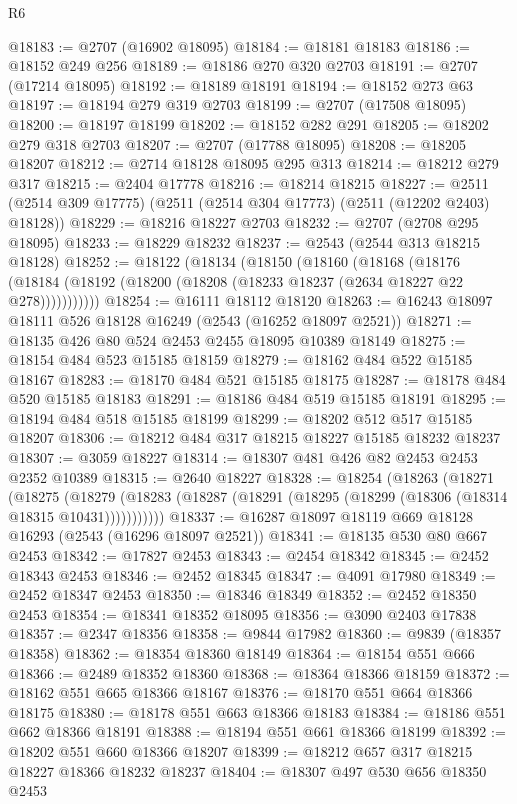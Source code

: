 \begin{lexlean}{R6}
\begin{coremodule}
@18183 := @2707 (@16902 @18095)
@18184 := @18181 @18183
@18186 := @18152 @249 @256
@18189 := @18186 @270 @320 @2703
@18191 := @2707 (@17214 @18095)
@18192 := @18189 @18191
@18194 := @18152 @273 @63
@18197 := @18194 @279 @319 @2703
@18199 := @2707 (@17508 @18095)
@18200 := @18197 @18199
@18202 := @18152 @282 @291
@18205 := @18202 @279 @318 @2703
@18207 := @2707 (@17788 @18095)
@18208 := @18205 @18207
@18212 := @2714 @18128 @18095 @295 @313
@18214 := @18212 @279 @317
@18215 := @2404 @17778
@18216 := @18214 @18215
@18227 := @2511 (@2514 @309 @17775) (@2511 (@2514 @304 @17773) (@2511 (@12202 @2403) @18128))
@18229 := @18216 @18227 @2703
@18232 := @2707 (@2708 @295 @18095)
@18233 := @18229 @18232
@18237 := @2543 (@2544 @313 @18215 @18128)
@18252 := @18122
    (@18134
      (@18150
        (@18160
          (@18168
            (@18176 (@18184 (@18192 (@18200 (@18208 (@18233 @18237 (@2634 @18227 @22 @278)))))))))))
@18254 := @16111 @18112 @18120
@18263 := @16243 @18097 @18111 @526 @18128 @16249 (@2543 (@16252 @18097 @2521))
@18271 := @18135 @426 @80 @524 @2453 @2455 @18095 @10389 @18149
@18275 := @18154 @484 @523 @15185 @18159
@18279 := @18162 @484 @522 @15185 @18167
@18283 := @18170 @484 @521 @15185 @18175
@18287 := @18178 @484 @520 @15185 @18183
@18291 := @18186 @484 @519 @15185 @18191
@18295 := @18194 @484 @518 @15185 @18199
@18299 := @18202 @512 @517 @15185 @18207
@18306 := @18212 @484 @317 @18215 @18227 @15185 @18232 @18237
@18307 := @3059 @18227
@18314 := @18307 @481 @426 @82 @2453 @2453 @2352 @10389
@18315 := @2640 @18227
@18328 := @18254
    (@18263
      (@18271
        (@18275
          (@18279 (@18283 (@18287 (@18291 (@18295 (@18299 (@18306 (@18314 @18315 @10431)))))))))))
@18337 := @16287 @18097 @18119 @669 @18128 @16293 (@2543 (@16296 @18097 @2521))
@18341 := @18135 @530 @80 @667 @2453
@18342 := @17827 @2453
@18343 := @2454 @18342
@18345 := @2452 @18343 @2453
@18346 := @2452 @18345
@18347 := @4091 @17980
@18349 := @2452 @18347 @2453
@18350 := @18346 @18349
@18352 := @2452 @18350 @2453
@18354 := @18341 @18352 @18095
@18356 := @3090 @2403 @17838
@18357 := @2347 @18356
@18358 := @9844 @17982
@18360 := @9839 (@18357 @18358)
@18362 := @18354 @18360 @18149
@18364 := @18154 @551 @666
@18366 := @2489 @18352 @18360
@18368 := @18364 @18366 @18159
@18372 := @18162 @551 @665 @18366 @18167
@18376 := @18170 @551 @664 @18366 @18175
@18380 := @18178 @551 @663 @18366 @18183
@18384 := @18186 @551 @662 @18366 @18191
@18388 := @18194 @551 @661 @18366 @18199
@18392 := @18202 @551 @660 @18366 @18207
@18399 := @18212 @657 @317 @18215 @18227 @18366 @18232 @18237
@18404 := @18307 @497 @530 @656 @18350 @2453

\end{coremodule}
\end{lexlean}
